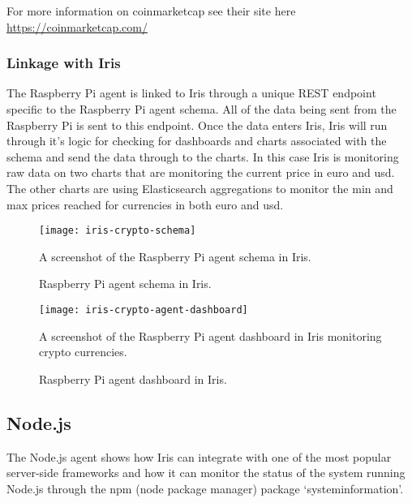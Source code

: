 \documentclass[12pt,a4paper,titlepage]{report}
\begin{document}
For more information on coinmarketcap see their site here \url{https://coinmarketcap.com/}

\subsubsection{Linkage with Iris}
The Raspberry Pi agent is linked to Iris through a unique REST endpoint specific to the Raspberry Pi agent schema. All of the data being sent from the Raspberry Pi is sent to this endpoint. Once the data enters Iris, Iris will run through it's logic for checking for dashboards and charts associated with the schema and send the data through to the charts. 
In this case Iris is monitoring raw data on two charts that are monitoring the current price in euro and usd. The other charts are using Elasticsearch aggregations to monitor the min and max prices reached for currencies in both euro and usd.

\begin{figure}[H]
\begin{tcolorbox}
\begin{center}
\texttt{[image: iris-crypto-schema]}
\end{center}
A screenshot of the Raspberry Pi agent schema in Iris.
\end{tcolorbox}
\caption{Raspberry Pi agent schema in Iris.}
\end{figure}

\begin{figure}[H]
\begin{tcolorbox}
\begin{center}
\texttt{[image: iris-crypto-agent-dashboard]}
\end{center}
A screenshot of the Raspberry Pi agent dashboard in Iris monitoring crypto currencies.
\end{tcolorbox}
\caption{Raspberry Pi agent dashboard in Iris.}
\end{figure}

\subsection{Node.js}
The Node.js agent shows how Iris can integrate with one of the most popular server-side frameworks and how it can monitor the status of the system running Node.js through the npm (node package manager) package `systeminformation'.
\end{document}

